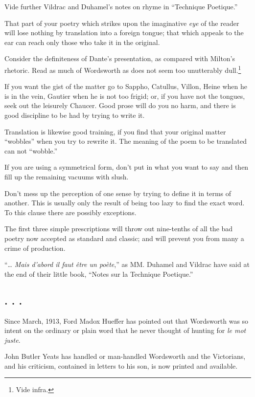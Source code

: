 Vide further Vildrac and Duhamel's notes on rhyme in ``Technique
Poetique.''

That part of your poetry which strikes upon the imaginative \emph{eye}
of the reader will lose nothing by translation into a foreign tongue;
that which appeals to the ear can reach only those who take it in the
original.

Consider the definiteness of Dante's presentation, as compared with
Milton's rhetoric. Read as much of Wordsworth as does not seem too
unutterably dull.\footnote{Vide infra.}

If you want the gist of the matter go to Sappho, Catullus, Villon, Heine
when he is in the vein, Gautier when he is not too frigid; or, if you
have not the tongues, seek out the leisurely Chaucer. Good prose will do
you no harm, and there is good discipline to be had by trying to write
it.

Translation is likewise good training, if you find that your original
matter ``wobbles'' when you try to rewrite it. The meaning of the poem
to be translated can not ``wobble.''

If you are using a symmetrical form, don't put in what you want to say
and then fill up the remaining vacuums with slush.

Don't mess up the perception of one sense by trying to define it in
terms of another. This is usually only the result of being too lazy to
find the exact word. To this clause there are possibly exceptions.

The first three simple prescriptions will throw out nine-tenths of all
the bad poetry now accepted as standard and classic; and will prevent
you from many a crime of production.

``\ldots{} \emph{Mais d'abord il faut être un poète},'' as MM. Duhamel
and Vildrac have said at the end of their little book, ``Notes sur la
Technique Poetique.''

\subsection{. . .}\label{section-1}

Since March, 1913, Ford Madox Hueffer has pointed out that Wordsworth
was so intent on the ordinary or plain word that he never thought of
hunting for \emph{le mot juste}.

John Butler Yeats has handled or man-handled Wordsworth and the
Victorians, and his criticism, contained in letters to his son, is now
printed and available.

